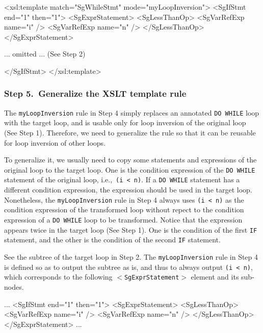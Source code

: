 \begin{framed}
\begin{src}
<xsl:template match="SgWhileStmt" mode="myLoopInversion">
  <SgIfStmt end="1" then="1">
    <SgExprStatement> 
      <SgLessThanOp>
        <SgVarRefExp name="i" />
        <SgVarRefExp name="n" />
      </SgLessThanOp>
    </SgExprStatement>

    ... omitted ... (See Step 2)

  </SgIfStmt>
</xsl:template>
\end{src}
\end{framed}


\subsubsection*{Step 5.~Generalize the XSLT template rule}
The \texttt{myLoopInversion} rule in Step 4 simply replaces an annotated
\texttt{DO WHILE} loop with the target loop, and is usable only for loop
inversion of the original loop (See Step 1). Therefore, we need to
generalize the rule so that it can be reusable for loop inversion of
other loops.

To generalize it, we usually need to copy some statements and
expressions of the original loop to the target loop.  One is the
condition expression of the \texttt{DO WHILE} statement of the original
loop, i.e.,~\texttt{(i < n)}. If a \texttt{DO WHILE} statement has a
different condition expression, the expression should be used in the
target loop. Nonetheless, the \texttt{myLoopInversion} rule in Step 4
always uses \texttt{(i < n)} as the condition expression of the
transformed loop without repect to the condition expression of a
\texttt{DO WHILE} loop to be transformed.  Notice that the expression
appears twice in the target loop (See Step 1). One is the condition of
the first \texttt{IF} statement, and the other is the condition of the
second \texttt{IF} statement.

See the subtree of the target loop in Step 2. The
\texttt{myLoopInversion} rule in Step 4 is defined so as to output the
subtree as is, and thus to always output \texttt{(i < n)}, which
corresponds to the following \texttt{$<$SgExprStatement$>$} element and
its sub-nodes.
\begin{framed}
\begin{src}
...
<SgIfStmt end="1" then="1">
  <SgExprStatement>
    <SgLessThanOp>
      <SgVarRefExp name="i" />
      <SgVarRefExp name="n" />
    </SgLessThanOp>
  </SgExprStatement>
...
\end{src}
\end{framed}

